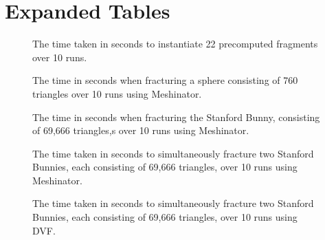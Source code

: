 \appendix

\chapter{Expanded Tables}

\begin{figure}[h!]
\caption{The time taken in seconds to instantiate 22 precomputed fragments over 10 runs.}
\label{fig:A.0.1}
\end{figure}

\begin{figure}[h!]
\caption{The time in seconds when fracturing a sphere consisting of 760 triangles over 10 runs using Meshinator.}
\label{fig:A.1.1}
\end{figure}

\begin{figure}[h!]
\caption{The time in seconds when fracturing the Stanford Bunny, consisting of 69,666 triangles,s over 10 runs using Meshinator.}
\label{fig:A.2.1}
\end{figure}

\begin{figure}[h!]
\caption{The time taken in seconds to simultaneously fracture two Stanford Bunnies, each consisting of 69,666 triangles, over 10 runs using Meshinator.}
\label{fig:A.3.1}
\end{figure}

\begin{figure}[h!]
\caption{The time taken in seconds to simultaneously fracture two Stanford Bunnies, each consisting of 69,666 triangles, over 10 runs using DVF.}
\label{fig:A.3}
\end{figure}

